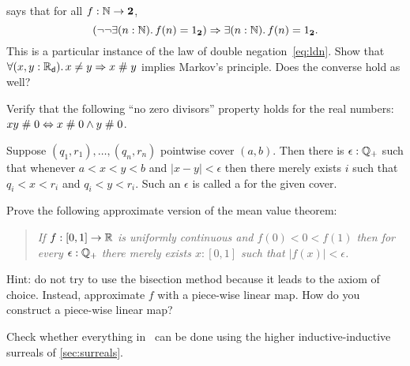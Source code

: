 \begin{ex} \label{ex:reals-apart-neq-MP}
  says that for all $f : \mathbb{N} \to \mathbf{2}$,
  \begin{equation*}
    (\lnot \lnot \exis{n : \nat} f(n) = \btrue)
    \Rightarrow
    \exis{n : \nat} f(n) = \btrue.
  \end{equation*}
  This is a particular instance of the law of double negation~\eqref{eq:ldn}. Show that
  $\fall{x, y: \RD} x \neq y \Rightarrow x \apart y$ implies Markov's principle. Does the
  converse hold as well?
\end{ex}

\begin{ex} \label{ex:reals-apart-zero-divisors}
  Verify that the following ``no zero divisors'' property holds for the real numbers:
  $x y \mathrel{\#} 0 \Leftrightarrow x \mathrel{\#} 0 \land y \mathrel{\#} 0$.
\end{ex}

\begin{ex} \label{ex:finite-cover-lebesgue-number}
  Suppose $(q_1, r_1), \ldots, (q_n, r_n)$ pointwise cover $(a, b)$. Then there is
  $\epsilon : \mathbb{Q}_{+}$ such that whenever $a < x < y < b$ and $|x - y| < \epsilon$
  then there merely exists $i$ such that $q_i < x < r_i$ and $q_i < y < r_i$. Such an
  $\epsilon$ is called a 
  for the given cover.
\end{ex}

\begin{ex} \label{ex:mean-value-theorem}
  Prove the following approximate version of the mean value theorem:
  \begin{quote}
    \emph{
      If $f : [0,1] \to \mathbb{R}$ is uniformly continuous and $f(0) < 0 < f(1)$ then
      for every $\epsilon : \mathbb{Q}_{+}$ there merely exists $x : [0,1]$ such that $|f(x)| <
      \epsilon$.
    }
  \end{quote}
  Hint: do not try to use the bisection method because it leads to the axiom of choice.
  Instead, approximate $f$ with a piece-wise linear map. How do you construct a piece-wise
  linear map?
\end{ex}

\begin{ex}
  Check whether everything in~\cite{knuth74:_surreal_number} can be done using the higher
  inductive-inductive surreals of \autoref{sec:surreals}.
\end{ex}


